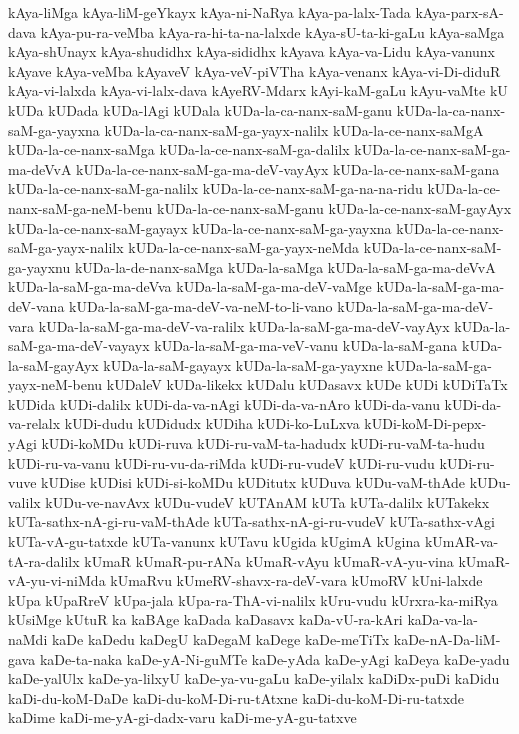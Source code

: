 {kAya-liMga
kAya-liM-geYkayx
kAya-ni-NaRya
kAya-pa-lalx-Tada
kAya-parx-sA-dava
kAya-pu-ra-veMba
kAya-ra-hi-ta-na-lalxde
kAya-sU-ta-ki-gaLu
kAya-saMga
kAya-shUnayx
kAya-shudidhx
kAya-sididhx
kAyava
kAya-va-Lidu
kAya-vanunx
kAyave
kAya-veMba
kAyaveV
kAya-veV-piVTha
kAya-venanx
kAya-vi-Di-diduR
kAya-vi-lalxda
kAya-vi-lalx-dava
kAyeRV-Mdarx
kAyi-kaM-gaLu
kAyu-vaMte
kU
kUDa
kUDada
kUDa-lAgi
kUDala
kUDa-la-ca-nanx-saM-ganu
kUDa-la-ca-nanx-saM-ga-yayxna
kUDa-la-ca-nanx-saM-ga-yayx-nalilx
kUDa-la-ce-nanx-saMgA
kUDa-la-ce-nanx-saMga
kUDa-la-ce-nanx-saM-ga-dalilx
kUDa-la-ce-nanx-saM-ga-ma-deVvA
kUDa-la-ce-nanx-saM-ga-ma-deV-vayAyx
kUDa-la-ce-nanx-saM-gana
kUDa-la-ce-nanx-saM-ga-nalilx
kUDa-la-ce-nanx-saM-ga-na-na-ridu
kUDa-la-ce-nanx-saM-ga-neM-benu
kUDa-la-ce-nanx-saM-ganu
kUDa-la-ce-nanx-saM-gayAyx
kUDa-la-ce-nanx-saM-gayayx
kUDa-la-ce-nanx-saM-ga-yayxna
kUDa-la-ce-nanx-saM-ga-yayx-nalilx
kUDa-la-ce-nanx-saM-ga-yayx-neMda
kUDa-la-ce-nanx-saM-ga-yayxnu
kUDa-la-de-nanx-saMga
kUDa-la-saMga
kUDa-la-saM-ga-ma-deVvA
kUDa-la-saM-ga-ma-deVva
kUDa-la-saM-ga-ma-deV-vaMge
kUDa-la-saM-ga-ma-deV-vana
kUDa-la-saM-ga-ma-deV-va-neM-to-li-vano
kUDa-la-saM-ga-ma-deV-vara
kUDa-la-saM-ga-ma-deV-va-ralilx
kUDa-la-saM-ga-ma-deV-vayAyx
kUDa-la-saM-ga-ma-deV-vayayx
kUDa-la-saM-ga-ma-veV-vanu
kUDa-la-saM-gana
kUDa-la-saM-gayAyx
kUDa-la-saM-gayayx
kUDa-la-saM-ga-yayxne
kUDa-la-saM-ga-yayx-neM-benu
kUDaleV
kUDa-likekx
kUDalu
kUDasavx
kUDe
kUDi
kUDiTaTx
kUDida
kUDi-dalilx
kUDi-da-va-nAgi
kUDi-da-va-nAro
kUDi-da-vanu
kUDi-da-va-relalx
kUDi-dudu
kUDidudx
kUDiha
kUDi-ko-LuLxva
kUDi-koM-Di-pepx-yAgi
kUDi-koMDu
kUDi-ruva
kUDi-ru-vaM-ta-hadudx
kUDi-ru-vaM-ta-hudu
kUDi-ru-va-vanu
kUDi-ru-vu-da-riMda
kUDi-ru-vudeV
kUDi-ru-vudu
kUDi-ru-vuve
kUDise
kUDisi
kUDi-si-koMDu
kUDitutx
kUDuva
kUDu-vaM-thAde
kUDu-valilx
kUDu-ve-navAvx
kUDu-vudeV
kUTAnAM
kUTa
kUTa-dalilx
kUTakekx
kUTa-sathx-nA-gi-ru-vaM-thAde
kUTa-sathx-nA-gi-ru-vudeV
kUTa-sathx-vAgi
kUTa-vA-gu-tatxde
kUTa-vanunx
kUTavu
kUgida
kUgimA
kUgina
kUmAR-va-tA-ra-dalilx
kUmaR
kUmaR-pu-rANa
kUmaR-vAyu
kUmaR-vA-yu-vina
kUmaR-vA-yu-vi-niMda
kUmaRvu
kUmeRV-shavx-ra-deV-vara
kUmoRV
kUni-lalxde
kUpa
kUpaRreV
kUpa-jala
kUpa-ra-ThA-vi-nalilx
kUru-vudu
kUrxra-ka-miRya
kUsiMge
kUtuR
ka
kaBAge
kaDada
kaDasavx
kaDa-vU-ra-kAri
kaDa-va-la-naMdi
kaDe
kaDedu
kaDegU
kaDegaM
kaDege
kaDe-meTiTx
kaDe-nA-Da-liM-gava
kaDe-ta-naka
kaDe-yA-Ni-guMTe
kaDe-yAda
kaDe-yAgi
kaDeya
kaDe-yadu
kaDe-yalUlx
kaDe-ya-lilxyU
kaDe-ya-vu-gaLu
kaDe-yilalx
kaDiDx-puDi
kaDidu
kaDi-du-koM-DaDe
kaDi-du-koM-Di-ru-tAtxne
kaDi-du-koM-Di-ru-tatxde
kaDime
kaDi-me-yA-gi-dadx-varu
kaDi-me-yA-gu-tatxve
}
